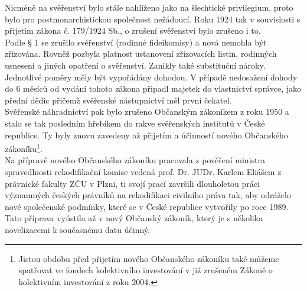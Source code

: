 \documentclass{article}
\begin{document}
Nicméně na svěřenství bylo stále nahlíženo jako na šlechtické privilegium, proto bylo pro postmonarchistickou společnost nežádoucí. Roku 1924 tak v souvislosti s přijetím zákona č. 179/1924 Sb., o zrušení svěřenství bylo zrušeno i to.\\

Podle § 1 se zrušilo svěřenství (rodinné fideikomisy) a nová nemohla být zřizována. Rovněž pozbyla platnost ustanovení zřizovacích listin, rodinných usnesení a jiných opatření o svěřenství. Zanikly také substituční nároky. Jednotlivé poměry měly být vypořádány dohodou. V případě nedosažení dohody do 6 měsíců od vydání tohoto zákona připadl majetek do vlastnictví správce, jako přední dědic přičemž svěřenské nástupnictví měl první čekatel.\\

Svěřenské náhradnictví pak bylo zrušeno Občanským zákoníkem z roku 1950 a stalo se tak posledním hřebíkem do rakve svěřenských institutů v České republice. Ty byly znovu zavedeny až přijetím a účinností nového Občanského zákoníku\footnote{Jistou obdobu před přijetím nového Občanského zákoníku také můžeme spatřovat ve fondech kolektivního investování v již zrušeném Zákoně o kolektivním investování z roku 2004.}.\\

Na přípravě nového Občanského zákoníku pracovala z pověření ministra spravedlnosti rekodifikační komise vedená prof. Dr. JUDr. Karlem Eliášem z právnické fakulty ZČU v Plzni, ti svojí prací završili dlouholetou práci významných českých právníků na rekodifikaci civilního práva tak, aby odráželo nové společenské podmínky, které se v České republice vytvořily po roce 1989. Tato příprava vyústila až v nový Občanský zákoník, který je s několika novelizacemi k současnému datu účinný.\\




\end{document}
